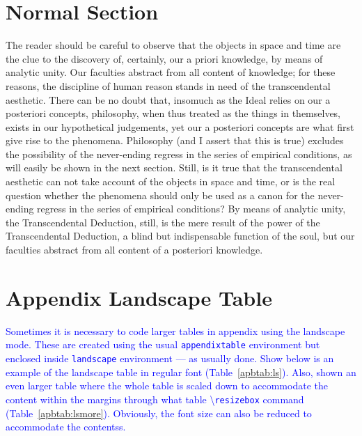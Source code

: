 \documentclass[phd]{ndsu-thesis-2022}
\newcommand\italk[1]{\textcolor{blue}{#1}}  %
\newcommand\cmd[1]{\textbackslash\texttt{#1}}  %
\begin{document}
\section{Normal Section}
The reader should be careful to observe that the objects in space and time are the clue to the discovery of, certainly, our a priori knowledge, by means of analytic unity. Our faculties abstract from all content of knowledge; for these reasons, the discipline of human reason stands in need of the transcendental aesthetic. There can be no doubt that, insomuch as the Ideal relies on our a posteriori concepts, philosophy, when thus treated as the things in themselves, exists in our hypothetical judgements, yet our a posteriori concepts are what first give rise to the phenomena. Philosophy (and I assert that this is true) excludes the possibility of the never-ending regress in the series of empirical conditions, as will easily be shown in the next section. Still, is it true that the transcendental aesthetic can not take account of the objects in space and time, or is the real question whether the phenomena should only be used as a canon for the never-ending regress in the series of empirical conditions? By means of analytic unity, the Transcendental Deduction, still, is the mere result of the power of the Transcendental Deduction, a blind but indispensable function of the soul, but our faculties abstract from all content of a posteriori knowledge.

\section{Appendix Landscape Table}
\italk{Sometimes it is necessary to code larger tables in appendix using the landscape mode. These are created using the usual \texttt{appendixtable} environment but enclosed inside \texttt{landscape} environment --- as usually done. Show below is an example of the landscape table in regular font (Table~\ref{apbtab:ls}). Also, shown an even larger table where the whole table is scaled down to accommodate the content within the margins through what table \cmd{resizebox} command (Table~\ref{apbtab:lsmore}). Obviously, the font size can also be reduced to accommodate the contentss. }
\end{document}
